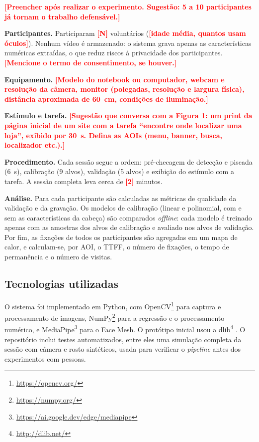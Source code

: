 \documentclass[sigconf, nonacm, language=english, language=portuguese, natbib=false]{acmart}
\newcommand{\pendente}[1]{\textcolor{red}{\textbf{[#1]}}}
\begin{document}
\pendente{Preencher após realizar o experimento. Sugestão: 5 a 10 participantes já tornam o trabalho defensável.}

\textbf{Participantes.} Participaram \pendente{N} voluntários (\pendente{idade média, quantos usam óculos}). Nenhum vídeo é armazenado: o sistema grava apenas as características numéricas extraídas, o que reduz riscos à privacidade dos participantes. \pendente{Mencione o termo de consentimento, se houver.}

\textbf{Equipamento.} \pendente{Modelo do notebook ou computador, webcam e resolução da câmera, monitor (polegadas, resolução e largura física), distância aproximada de 60~cm, condições de iluminação.}

\textbf{Estímulo e tarefa.} \pendente{Sugestão que conversa com a Figura 1: um print da página inicial de um site com a tarefa ``encontre onde localizar uma loja'', exibido por 30~s. Defina as AOIs (menu, banner, busca, localizador etc.).}

\textbf{Procedimento.} Cada sessão segue a ordem: pré-checagem de detecção e piscada (6~s), calibração (9 alvos), validação (5 alvos) e exibição do estímulo com a tarefa. A sessão completa leva cerca de \pendente{2} minutos.

\textbf{Análise.} Para cada participante são calculadas as métricas de qualidade da validação e da gravação. Os modelos de calibração (linear e polinomial, com e sem as características da cabeça) são comparados \emph{offline}: cada modelo é treinado apenas com as amostras dos alvos de calibração e avaliado nos alvos de validação. Por fim, as fixações de todos os participantes são agregadas em um mapa de calor, e calculam-se, por AOI, o TTFF, o número de fixações, o tempo de permanência e o número de visitas.

\subsection{Tecnologias utilizadas}
O sistema foi implementado em Python, com OpenCV\footnote{\url{https://opencv.org/}} \cite{opencv} para captura e processamento de imagens, NumPy\footnote{\url{https://numpy.org/}} \cite{numpy} para a regressão e o processamento numérico, e MediaPipe\footnote{\url{https://ai.google.dev/edge/mediapipe}} \cite{lugaresi2019mediapipe} para o Face Mesh. O protótipo inicial usou a dlib\footnote{\url{http://dlib.net/}} \cite{King2009}. O repositório inclui testes automatizados, entre eles uma simulação completa da sessão com câmera e rosto sintéticos, usada para verificar o \emph{pipeline} antes dos experimentos com pessoas.
\end{document}
